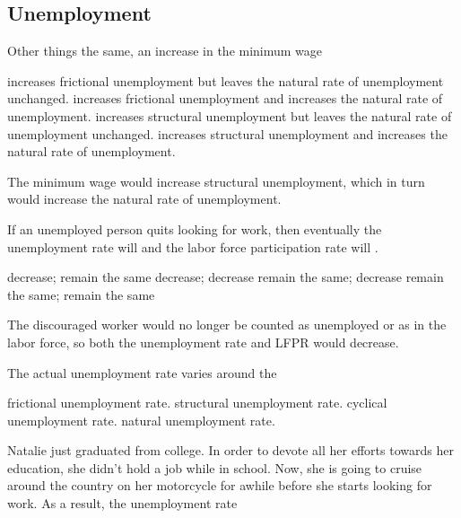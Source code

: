 \documentclass[addpoints,11pt]{exam}
\theoremstyle{definition}
\newcommand{\blank}[0]{\underline{\hspace{3cm}}}
\begin{document}
\subsection*{Unemployment}

\begin{questions}
	
	\question Other things the same, an increase in the minimum wage 
	
	\begin{choices}
		\choice increases frictional unemployment but leaves the natural rate of unemployment unchanged.
		\choice  increases frictional unemployment and increases the natural rate of unemployment.
		\choice  increases structural unemployment but leaves the natural rate of unemployment unchanged.
		\CorrectChoice increases structural unemployment and increases the natural rate of unemployment.
	\end{choices}
	
	\begin{solution}
		The minimum wage would increase structural unemployment, which in turn would increase the natural rate of unemployment.
	\end{solution}
	
	\question If an unemployed person quits looking for work, then eventually the unemployment rate will \blank and the labor force participation rate will \blank.
	
	\begin{choices}
		\choice decrease; remain the same
		\CorrectChoice decrease; decrease
		\choice remain the same; decrease
		\choice remain the same; remain the same
	\end{choices}
	
	\begin{solution}
		The discouraged worker would no longer be counted as unemployed or as in the labor force, so both the unemployment rate and LFPR would decrease.
	\end{solution}
	
		\question The actual unemployment rate varies around the 
		
		\begin{choices}
			\choice frictional unemployment rate.
			\choice structural unemployment rate.
			\choice cyclical unemployment rate. 
			\CorrectChoice natural unemployment rate.
		\end{choices}

		\question Natalie just graduated from college. In order to devote all her efforts towards her education, she didn't hold a job while in school. Now, she is going to cruise around the country on her motorcycle for awhile before she starts looking for work. As a result, the unemployment rate
		

\end{questions}
\end{document}
